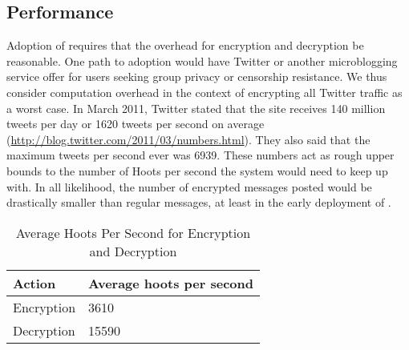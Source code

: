 %

\subsection{Performance}

Adoption of \hoot requires that the overhead for encryption and
decryption be reasonable. One path to adoption would have Twitter or
another microblogging service offer \hoot for users seeking group
privacy or censorship resistance. We thus consider computation overhead
in the context of encrypting all Twitter traffic as a worst case. In
March 2011, Twitter stated that the site receives 140 million tweets per
day or 1620 tweets per second on average
(\url{http://blog.twitter.com/2011/03/numbers.html}). They also said
that the maximum tweets per second ever was 6939. These numbers act as
rough upper bounds to the number of Hoots per second the system would
need to keep up with. In all likelihood, the number of encrypted
messages posted would be drastically smaller than regular messages, at
least in the early deployment of \hoot.

\begin{table}
\caption{Average Hoots Per Second for Encryption and Decryption
\label{tab:hps}
}
\begin{center}
    \begin{tabular}{ l  l }
	\hline
	Action & Average hoots per second \\ \hline
	Encryption & 3610 \\
	Decryption & 15590 \\ \hline
    \end{tabular}
\end{center}
\end{table}

